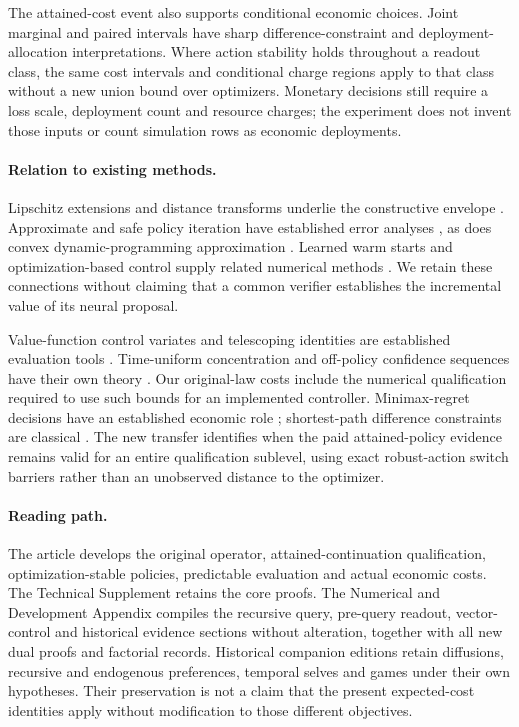 \documentclass[ecta,nameyear,draft]{econsocart}
\begin{document}
The attained-cost event also supports conditional economic choices. Joint marginal and paired intervals have sharp difference-constraint and deployment-allocation interpretations. Where action stability holds throughout a readout class, the same cost intervals and conditional charge regions apply to that class without a new union bound over optimizers. Monetary decisions still require a loss scale, deployment count and resource charges; the experiment does not invent those inputs or count simulation rows as economic deployments.

\paragraph{Relation to existing methods.}
Lipschitz extensions and distance transforms underlie the constructive envelope \citep{mcshane1934,felzenszwalb2012}. Approximate and safe policy iteration have established error analyses \citep{munos2003,pirotta2013,scherrer2015}, as does convex dynamic-programming approximation \citep{yang2020convex}. Learned warm starts and optimization-based control supply related numerical methods \citep{sakaue2023warm,sambharya2023,agrawal2020control}. We retain these connections without claiming that a common verifier establishes the incremental value of its neural proposal.

Value-function control variates and telescoping identities are established evaluation tools \citep{munos2006variance,jiang2016}. Time-uniform concentration and off-policy confidence sequences have their own theory \citep{howard2020time,karampatziakis2021}. Our original-law costs include the numerical qualification required to use such bounds for an implemented controller. Minimax-regret decisions have an established economic role \citep{manski2004}; shortest-path difference constraints are classical \citep{floyd1962}. The new transfer identifies when the paid attained-policy evidence remains valid for an entire qualification sublevel, using exact robust-action switch barriers rather than an unobserved distance to the optimizer.

\paragraph{Reading path.}
The article develops the original operator, attained-continuation qualification, optimization-stable policies, predictable evaluation and actual economic costs. The Technical Supplement retains the core proofs. The Numerical and Development Appendix compiles the recursive query, pre-query readout, vector-control and historical evidence sections without alteration, together with all new dual proofs and factorial records. Historical companion editions retain diffusions, recursive and endogenous preferences, temporal selves and games under their own hypotheses. Their preservation is not a claim that the present expected-cost identities apply without modification to those different objectives.
\end{document}
